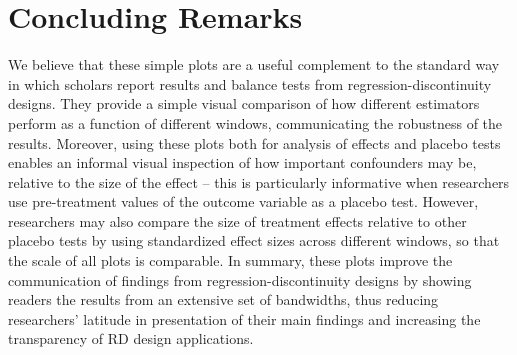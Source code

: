 \documentclass[letterpaper,twoside,12pt]{article}\usepackage[]{graphicx}\usepackage[]{color}
\begin{document}
\section*{Concluding Remarks}

We believe that these simple plots are a useful complement to the standard way in which scholars report results and balance tests from regression-discontinuity designs. They provide a simple visual comparison of how different estimators perform as a function of different windows, communicating the robustness of the results. Moreover, using these plots both for analysis of effects and placebo tests enables an informal visual inspection of how important confounders may be, relative to the size of the effect -- this is particularly informative when researchers use pre-treatment values of the outcome variable as a placebo test. However, researchers may also compare the size of treatment effects relative to other placebo tests by using standardized effect sizes across different windows, so that the scale of all plots is comparable. In summary, these plots improve the communication of findings from regression-discontinuity designs by showing readers the results from an extensive set of bandwidths, thus reducing researchers' latitude in presentation of their main findings and increasing the transparency of RD design applications.





\clearpage
	

\end{document}
